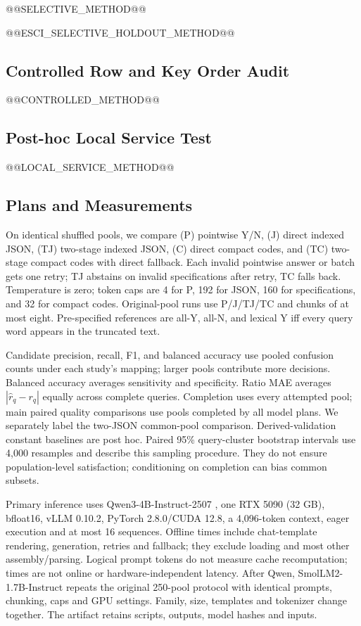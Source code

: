 \documentclass[conference]{IEEEtran}
\begin{document}
@@SELECTIVE_METHOD@@

@@ESCI_SELECTIVE_HOLDOUT_METHOD@@

\subsection{Controlled Row and Key Order Audit}
@@CONTROLLED_METHOD@@

\subsection{Post-hoc Local Service Test}
@@LOCAL_SERVICE_METHOD@@

\subsection{Plans and Measurements}
On identical shuffled pools, we compare (P) pointwise Y/N, (J) direct indexed JSON, (TJ) two-stage indexed JSON, (C) direct compact codes, and (TC) two-stage compact codes with direct fallback. Each invalid pointwise answer or batch gets one retry; TJ abstains on invalid specifications after retry, TC falls back. Temperature is zero; token caps are 4 for P, 192 for JSON, 160 for specifications, and 32 for compact codes. Original-pool runs use P/J/TJ/TC and chunks of at most eight. Pre-specified references are all-Y, all-N, and lexical Y iff every query word appears in the truncated text.

Candidate precision, recall, F1, and balanced accuracy use pooled confusion counts under each study's mapping; larger pools contribute more decisions. Balanced accuracy averages sensitivity and specificity. Ratio MAE averages $|\hat r_q-r_q|$ equally across complete queries. Completion uses every attempted pool; main paired quality comparisons use pools completed by all model plans. We separately label the two-JSON common-pool comparison. Derived-validation constant baselines are post hoc. Paired 95\% query-cluster bootstrap intervals use 4,000 resamples and describe this sampling procedure. They do not ensure population-level satisfaction; conditioning on completion can bias common subsets.

Primary inference uses Qwen3-4B-Instruct-2507 \cite{qwen}, one RTX 5090 (32 GB), bfloat16, vLLM 0.10.2, PyTorch 2.8.0/CUDA 12.8, a 4,096-token context, eager execution and at most 16 sequences. Offline times include chat-template rendering, generation, retries and fallback; they exclude loading and most other assembly/parsing. Logical prompt tokens do not measure cache recomputation; times are not online or hardware-independent latency. After Qwen, SmolLM2-1.7B-Instruct \cite{smollm} repeats the original 250-pool protocol with identical prompts, chunking, caps and GPU settings. Family, size, templates and tokenizer change together. The artifact retains scripts, outputs, model hashes and inputs.
\end{document}
